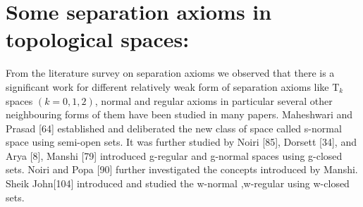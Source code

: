\section{Some separation axioms in topological spaces:}

From the literature survey on separation axioms we observed that there is a significant work for different relatively weak form of separation axioms like $\mbox{T}_k$ spaces $(k=0, 1, 2)$, normal and regular axioms in particular several other neighbouring forms of them have been studied in many papers.
Maheshwari and Prasad [64] established and deliberated the new class of space called s-normal space using semi-open sets. It was further studied by Noiri [85], Dorsett [34], and Arya [8], Manshi [79] introduced g-regular and g-normal spaces using g-closed sets. Noiri and Popa [90] further investigated the concepts introduced by Manshi. Sheik John[104] introduced and studied the w-normal ,w-regular using w-closed sets.

